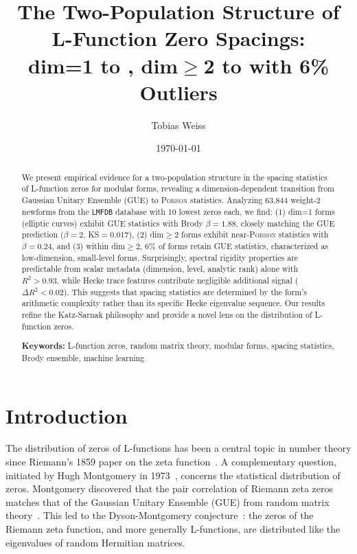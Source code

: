 \documentclass[11pt, a4paper]{article}
\title{The Two-Population Structure of L-Function Zero Spacings: \\ dim=1 to \GUE{}, dim$\geq$2 to \Poisson{} with 6\% Outliers}
\author{Tobias Weiss}
\date{\today}
\providecommand{\keywords}[1]{\par\medskip\noindent\textbf{Keywords:} #1}
\newcommand{\GUE}{\textsc{GUE}}
\newcommand{\Poisson}{\textsc{Poisson}}
\newcommand{\LMFDB}{\texttt{LMFDB}}
\begin{document}
\maketitle

\begin{abstract}
We present empirical evidence for a two-population structure in the spacing statistics of L-function zeros for modular forms, revealing a dimension-dependent transition from Gaussian Unitary Ensemble (\GUE{}) to \Poisson{} statistics. Analyzing 63,844 weight-2 newforms from the \LMFDB{} database with 10 lowest zeros each, we find: (1) dim=1 forms (elliptic curves) exhibit \GUE{} statistics with Brody $\beta=1.88$, closely matching the \GUE{} prediction ($\beta=2$, KS$=0.017$), (2) dim$\geq$2 forms exhibit near-\Poisson{} statistics with $\beta=0.24$, and (3) within dim$\geq$2, 6\% of forms retain \GUE{} statistics, characterized as low-dimension, small-level forms. Surprisingly, spectral rigidity properties are predictable from scalar metadata (dimension, level, analytic rank) alone with $R^2>0.93$, while Hecke trace features contribute negligible additional signal ($\Delta R^2<0.02$). This suggests that spacing statistics are determined by the form's arithmetic complexity rather than its specific Hecke eigenvalue sequence. Our results refine the Katz-Sarnak philosophy and provide a novel lens on the distribution of L-function zeros.

\keywords{L-function zeros, random matrix theory, modular forms, spacing statistics, Brody ensemble, machine learning}
\end{abstract}

\tableofcontents

\section{Introduction}
\label{sec:introduction}

The distribution of zeros of L-functions has been a central topic in number theory since Riemann's 1859 paper on the zeta function~\cite{riemann1859}. A complementary question, initiated by Hugh Montgomery in 1973~\cite{montgomery1973}, concerns the statistical distribution of zeros. Montgomery discovered that the pair correlation of Riemann zeta zeros matches that of the Gaussian Unitary Ensemble (\GUE{}) from random matrix theory~\cite{montgomery1973,mehta2004}. This led to the Dyson-Montgomery conjecture~\cite{dyson1962,montgomery1973}: the zeros of the Riemann zeta function, and more generally L-functions, are distributed like the eigenvalues of random Hermitian matrices.
\end{document}
